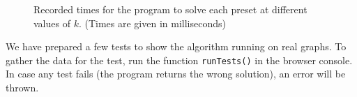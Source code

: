 \documentclass[table]{article}
\begin{document}
\begin{figure}[h]
\begin{subfigure}{0.49\linewidth}
    \end{subfigure}
    \begin{subfigure}{0.49\linewidth}
    \end{subfigure}
    \caption{Recorded times for the program to solve each preset at different values of $k$. (Times are given in milliseconds)}\label{g1}
\end{figure}
We have prepared a few tests to show the algorithm running on real graphs.
To gather the data for the test, run the function \lstinline{runTests()} in the browser console. 
In case any test fails (the program returns the wrong solution), an error will be thrown.
\end{document}
